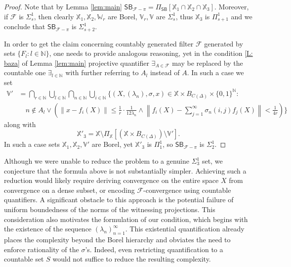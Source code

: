 \documentclass[12pt,fleqn]{amsart}
\newcommand{\IN}{\mathbb{N}}
\newcommand{\FF}{\mathscr{F}}
\renewcommand{\leq}{\leqslant}
\theoremstyle{definition}
\theoremstyle{remark}
\begin{document}
\begin{proof}
Note that by Lemma \ref{lem:main} $\mathsf{SB}_{\FF-\pi}=\Pi_{\mathsf{SB}}\left[\mathbb{X}_{1}\cap \mathbb{X}_{2} \cap \mathbb{X}_{3}\right]$. Moreover, if $\FF$ is $\Sigma_s^1$, then
clearly $\mathbb{X}_{1},\mathbb{X}_{2}, \mathbb{W}_{r}$ are Borel, $\mathbb{V}_{r}, \mathbb{V}$ are $\Sigma_s^1$, thus $\mathbb{X}_3$ is $\Pi^1_{s+1}$ and we conclude that $\mathsf{SB}_{\FF-\pi}$ is $\Sigma_{s+2}^1$.

In order to get the claim concerning countably generated filter \(\FF\) generated by sets \(\{F_l\colon l\in\IN\}\), one needs to provide analogous reasoning, yet in the condition \eqref{L: baza} of Lemma \ref{lem:main} projective quantifier $\exists_{A\in\FF}$ may be replaced by the countable one $\exists_{l\in\IN}$ with further referring to $A_l$ instead of $A$. In such a case we set 
            \begin{align*}
\mathbb{V'}
&= 
    \bigcap_{r\in\IN}
    \bigcup_{l\in\IN}
    \bigcap_{n\in\IN}
     \bigcup_{i \in \mathbb{N}} 
    \Bigg\{ (X, (\lambda_n), \sigma, x)\in \mathbb{X}\times B_{C(\Delta)}\times \{0,1\}^\IN \colon
\\
&\quad n \notin A_l \vee \left(
\| x-f_i(X)\| \leq \frac1r\cdot\frac{1}{12\lambda_n} \wedge \left\|f_i(X) - \sum_{j=1}^\infty \sigma_{n}(i,j) f_j(X)\right\| < \frac{1}{4r}\right)
  \Bigg\}
\end{align*}
along with
\[
\mathbb{X'}_3 = \mathbb{X} \setminus \Pi_{\mathbb{X}}\left[\left( \mathbb{X} \times B_{C(\Delta)}\right)\setminus \mathbb{V'}\right].
\]
In such a case sets  $\mathbb{X}_{1},\mathbb{X}_{2}, \mathbb{V'}$ are Borel, yet $\mathbb{X'}_{3}$ is $\Pi_1^1$, so $\mathsf{SB}_{\FF-\pi}$ is $\Sigma^1_2$.


  \end{proof}
%
Although we were unable to reduce the problem to a genuine $\Sigma^1_3$ set, we conjecture that the formula above is not substantially simpler. Achieving such a reduction would likely require deriving convergence on the entire space $X$ from convergence on a dense subset, or encoding $\mathcal{F}$-convergence using countable quantifiers. A significant obstacle to this approach is the potential failure of uniform boundedness of the norms of the witnessing projections. This consideration also motivates the formulation of our condition, which begins with the existence of the sequence $(\lambda_n)_{n=1}^\infty$. This existential quantification already places the complexity beyond the Borel hierarchy and obviates the need to enforce rationality of the $\sigma$'s. Indeed, even restricting quantification to a countable set $S$ would not suffice to reduce the resulting complexity.
\end{document}
